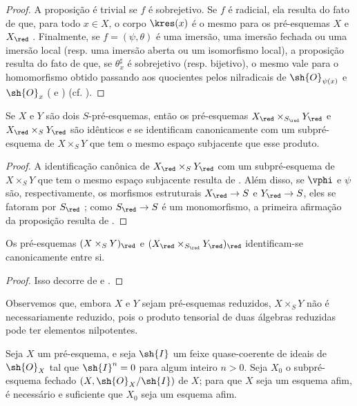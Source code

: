 \documentclass[oneside]{amsart}
\makeatletter
\newcommand{\ega@arrow}[2]{\mathchoice{#1}{#2}{#2}{#2}}
\renewcommand{\to}{\ega@arrow{\longrightarrow}{\rightarrow}}
\newcommand{\oldpage}[2][]{{\marginnote{\normalfont\textbf{#1}~|~#2}}\ignorespaces}
\let\EGAOriginalLabel\label
\renewcommand{\label}[1]{\phantomsection\EGAOriginalLabel{#1}}
\makeatother
\begin{document}
\begin{proof}
A proposição é trivial se $f$ é sobrejetivo.
Se $f$ é radicial, ela resulta do fato de que, para todo $x\in X$, o corpo $\kres(x)$ é o mesmo para os pré-esquemas $X$ e $X_\red$ .
Finalmente, se $f=(\psi,\theta)$ é uma imersão, uma imersão fechada ou uma imersão local (resp. uma imersão aberta ou um isomorfismo local), a proposição resulta do fato de que, se $\theta_x^\sharp$ é sobrejetivo (resp. bijetivo), o mesmo vale para o homomorfismo obtido passando aos quocientes pelos nilradicais de $\sh{O}_{\psi(x)}$ e $\sh{O}_x$ ( e ) (cf. ).
\end{proof}

\begin{proposition}[5.1.7]
\label{I.5.1.7}
Se $X$ e $Y$ são dois $S$-pré-esquemas, então os pré-esquemas $X_\red\times_{S_\red}Y_\red$ e $X_\red\times_S Y_\red$ são idênticos e se identificam canonicamente com um subpré-esquema de $X\times_S Y$ que tem o mesmo espaço subjacente que esse produto.
\end{proposition}

\begin{proof}
A identificação canônica de $X_\red\times_S Y_\red$ com um subpré-esquema de $X\times_S Y$ que tem o mesmo espaço subjacente resulta de .
Além disso, se $\vphi$ e $\psi$ são, respectivamente, os morfismos estruturais $X_\red\to S$ e $Y_\red\to S$, eles se fatoram por $S_\red$ ; como $S_\red\to S$ é um monomorfismo, a primeira afirmação da proposição resulta de .
\end{proof}

\begin{corollary}[5.1.8]
\label{I.5.1.8}
Os pré-esquemas $(X\times_S Y)_\red$ e $(X_\red\times_{S_\red}Y_\red)_\red$ identificam-se canonicamente entre si.
\end{corollary}

\begin{proof}
Isso decorre de  e .
\end{proof}

Observemos que, embora $X$ e $Y$ sejam pré-esquemas reduzidos, $X\times_S Y$ não é necessariamente reduzido, pois o produto tensorial de duas álgebras reduzidas pode ter elementos nilpotentes.

\begin{proposition}[5.1.9]
\label{I.5.1.9}
\oldpage[I]{130}
Seja $X$ um pré-esquema, e seja $\sh{I}$ um feixe quase-coerente de ideais de $\sh{O}_X$ tal que $\sh{I}^n=0$ para algum inteiro $n>0$.
Seja $X_0$ o subpré-esquema fechado $(X,\sh{O}_X/\sh{I})$ de $X$;
para que $X$ seja um esquema afim, é necessário e suficiente que $X_0$ seja um esquema afim.
\end{proposition}
\end{document}
